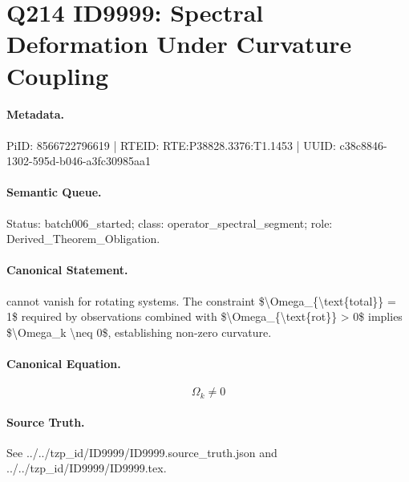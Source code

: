 \section*{Q214 ID9999: Spectral Deformation Under Curvature Coupling}
\paragraph{Metadata.}
PiID: 8566722796619 | RTEID: RTE:P38828.3376:T1.1453 | UUID: c38c8846-1302-595d-b046-a3fc30985aa1

\paragraph{Semantic Queue.}
Status: batch006\_started; class: operator\_spectral\_segment; role: Derived\_Theorem\_Obligation.

\paragraph{Canonical Statement.}
cannot vanish for rotating systems. The constraint \$\textbackslash{}Omega\_\{\textbackslash{}text\{total\}\} = 1\$ required by observations combined with \$\textbackslash{}Omega\_\{\textbackslash{}text\{rot\}\} > 0\$ implies \$\textbackslash{}Omega\_k \textbackslash{}neq 0\$, establishing non-zero curvature.

\paragraph{Canonical Equation.}
\[
\Omega_k \neq 0
\]

\paragraph{Source Truth.}
See ../../tzp\_id/ID9999/ID9999.source\_truth.json and ../../tzp\_id/ID9999/ID9999.tex.
